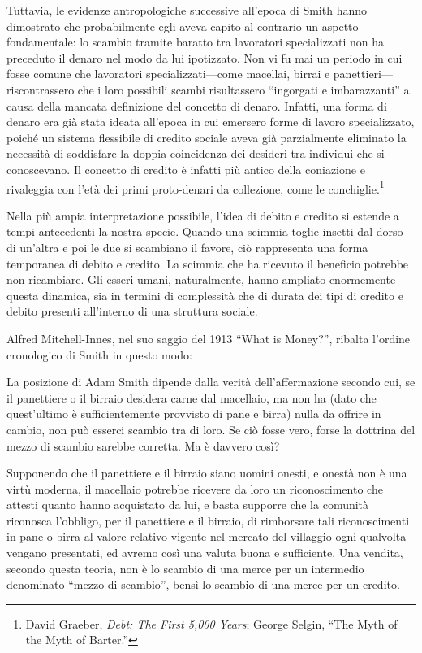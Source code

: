 \documentclass[
  a5paper,
  smalldemyvopaper,10pt,twoside,onecolumn,openright,extrafontsizes,hidelinks]{memoir}
\renewenvironment{quote}%
               {\list{}{\rightmargin=.6cm\leftmargin=.6cm}%
                \itshape \item[]}%
               {\endlist}
\begin{document}
Tuttavia, le evidenze antropologiche successive all'epoca di Smith hanno
dimostrato che probabilmente egli aveva capito al contrario un aspetto
fondamentale: lo scambio tramite baratto tra lavoratori specializzati
non ha preceduto il denaro nel modo da lui ipotizzato. Non vi fu mai un
periodo in cui fosse comune che lavoratori specializzati---come
macellai, birrai e panettieri---riscontrassero che i loro possibili
scambi risultassero ``ingorgati e imbarazzanti'' a causa della mancata
definizione del concetto di denaro. Infatti, una forma di denaro era già
stata ideata all'epoca in cui emersero forme di lavoro specializzato,
poiché un sistema flessibile di credito sociale aveva già parzialmente
eliminato la necessità di soddisfare la doppia coincidenza dei desideri
tra individui che si conoscevano. Il concetto di credito è infatti più
antico della coniazione e rivaleggia con l'età dei primi proto-denari da
collezione, come le conchiglie.\footnote{David Graeber, \emph{Debt: The
  First 5,000 Years}; George Selgin, ``The Myth of the Myth of Barter.''}

Nella più ampia interpretazione possibile, l'idea di debito e credito si
estende a tempi antecedenti la nostra specie. Quando una scimmia toglie
insetti dal dorso di un'altra e poi le due si scambiano il favore, ciò
rappresenta una forma temporanea di debito e credito. La scimmia che ha
ricevuto il beneficio potrebbe non ricambiare. Gli esseri umani,
naturalmente, hanno ampliato enormemente questa dinamica, sia in termini
di complessità che di durata dei tipi di credito e debito presenti
all'interno di una struttura sociale.

Alfred Mitchell-Innes, nel suo saggio del 1913 ``What is Money?'',
ribalta l'ordine cronologico di Smith in questo modo:

\begin{quote}
La posizione di Adam Smith dipende dalla verità dell'affermazione
secondo cui, se il panettiere o il birraio desidera carne dal macellaio,
ma non ha (dato che quest'ultimo è sufficientemente provvisto di pane e
birra) nulla da offrire in cambio, non può esserci scambio tra di loro.
Se ciò fosse vero, forse la dottrina del mezzo di scambio sarebbe
corretta. Ma è davvero così?
\end{quote}

\begin{quote}
Supponendo che il panettiere e il birraio siano uomini onesti, e onestà
non è una virtù moderna, il macellaio potrebbe ricevere da loro un
riconoscimento che attesti quanto hanno acquistato da lui, e basta
supporre che la comunità riconosca l'obbligo, per il panettiere e il
birraio, di rimborsare tali riconoscimenti in pane o birra al valore
relativo vigente nel mercato del villaggio ogni qualvolta vengano
presentati, ed avremo così una valuta buona e sufficiente. Una vendita,
secondo questa teoria, non è lo scambio di una merce per un intermedio
denominato ``mezzo di scambio'', bensì lo scambio di una merce per un
credito.
\end{quote}
\end{document}
